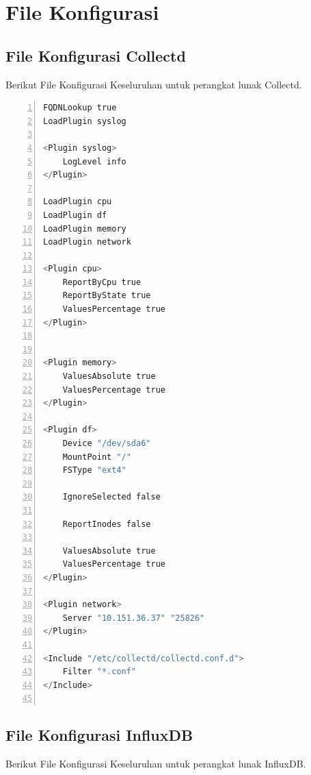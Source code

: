 \renewcommand\chaptername{LAMPIRAN}
\chapter{File Konfigurasi}
\section{File Konfigurasi Collectd}
\label{lampiranpushnotif}
  Berikut File Konfigurasi Keseluruhan untuk perangkat lunak Collectd.
  
  \begin{lstlisting}[numbers=left, frame=single,tabsize=2,breaklines,caption={Kode sumber Model Auth},label=modelAuth, language=python]
FQDNLookup true
LoadPlugin syslog

<Plugin syslog>
	LogLevel info
</Plugin>

LoadPlugin cpu
LoadPlugin df
LoadPlugin memory
LoadPlugin network

<Plugin cpu>
	ReportByCpu true
	ReportByState true
	ValuesPercentage true
</Plugin>


<Plugin memory>
	ValuesAbsolute true
	ValuesPercentage true
</Plugin>

<Plugin df>
	Device "/dev/sda6"
	MountPoint "/"
	FSType "ext4"

	IgnoreSelected false

	ReportInodes false

	ValuesAbsolute true
	ValuesPercentage true
</Plugin>

<Plugin network>
	Server "10.151.36.37" "25826"
</Plugin>

<Include "/etc/collectd/collectd.conf.d">
	Filter "*.conf"
</Include>


\end{lstlisting}

\section{File Konfigurasi InfluxDB}
\label{lampiranKonfigurasi InfluxDB}
  Berikut File Konfigurasi Keseluruhan untuk perangkat lunak InfluxDB.
  
